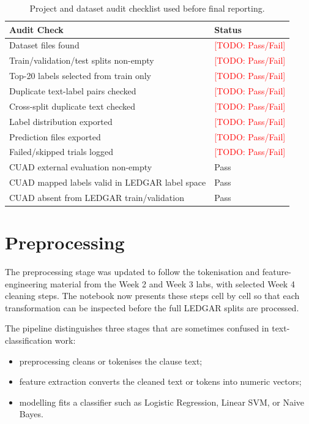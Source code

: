 \documentclass[11pt]{article}
\newcommand{\todo}[1]{\textcolor{red}{[TODO: #1]}}
\begin{document}
\begin{table}[t]
\centering
\small
\begin{tabular}{ll}
\toprule
\textbf{Audit Check} & \textbf{Status} \\
\midrule
Dataset files found & \todo{Pass/Fail} \\
Train/validation/test splits non-empty & \todo{Pass/Fail} \\
Top-20 labels selected from train only & \todo{Pass/Fail} \\
Duplicate text-label pairs checked & \todo{Pass/Fail} \\
Cross-split duplicate text checked & \todo{Pass/Fail} \\
Label distribution exported & \todo{Pass/Fail} \\
Prediction files exported & \todo{Pass/Fail} \\
Failed/skipped trials logged & \todo{Pass/Fail} \\
CUAD external evaluation non-empty & Pass \\
CUAD mapped labels valid in LEDGAR label space & Pass \\
CUAD absent from LEDGAR train/validation & Pass \\
\bottomrule
\end{tabular}
\caption{Project and dataset audit checklist used before final reporting.}
\label{tab:audit-checklist}
\end{table}

\section{Preprocessing}

The preprocessing stage was updated to follow the tokenisation and feature-engineering material from the Week 2 and Week 3 labs, with selected Week 4 cleaning steps. The notebook now presents these steps cell by cell so that each transformation can be inspected before the full LEDGAR splits are processed.

The pipeline distinguishes three stages that are sometimes confused in text-classification work:

\begin{itemize}[leftmargin=*]
    \item preprocessing cleans or tokenises the clause text;
    \item feature extraction converts the cleaned text or tokens into numeric vectors;
    \item modelling fits a classifier such as Logistic Regression, Linear SVM, or Naive Bayes.
\end{itemize}
\end{document}
